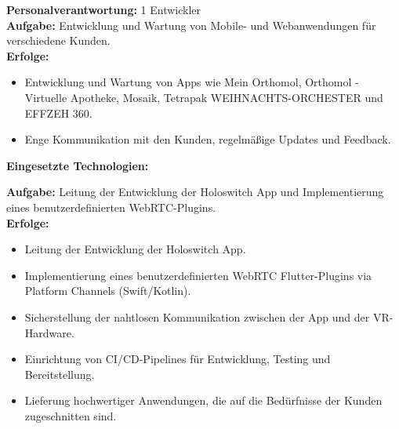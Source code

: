 \documentclass[10pt,a4paper,normalphoto]{altacv}
\begin{document}
\begin{fullwidth}
\newpage
\textbf{Personalverantwortung:} 1 Entwickler\\ 
\textbf{Aufgabe:} Entwicklung und Wartung von Mobile- und Webanwendungen für verschiedene Kunden.\\
\textbf{Erfolge:}
\begin{itemize}
    \item Entwicklung und Wartung von Apps wie Mein Orthomol, Orthomol - Virtuelle Apotheke, Mosaik, Tetrapak WEIHNACHTS-ORCHESTER und EFFZEH 360.
    \item Enge Kommunikation mit den Kunden, regelmäßige Updates und Feedback.
\end{itemize}

\textbf{Eingesetzte Technologien:}\\[0.4em]

\vspace{2em}

\textbf{Aufgabe:} Leitung der Entwicklung der Holoswitch App und Implementierung eines benutzerdefinierten WebRTC-Plugins.\\
\textbf{Erfolge:}
\begin{itemize}
    \item Leitung der Entwicklung der Holoswitch App.
    \item Implementierung eines benutzerdefinierten WebRTC Flutter-Plugins via Platform Channels (Swift/Kotlin).
    \item Sicherstellung der nahtlosen Kommunikation zwischen der App und der VR-Hardware.
    \item Einrichtung von CI/CD-Pipelines für Entwicklung, Testing und Bereitstellung.
    \item Lieferung hochwertiger Anwendungen, die auf die Bedürfnisse der Kunden zugeschnitten sind.
\end{itemize}


\end{fullwidth}
\end{document}
